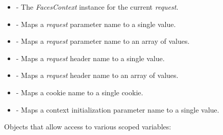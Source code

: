 \liststyleWWNumxi
\begin{itemize}
\item
{}\foreignlanguage{english}{
- The
}\foreignlanguage{english}{\textit{FacesContext}}\foreignlanguage{english}{
instance for the current
}\foreignlanguage{english}{\textit{request}}\foreignlanguage{english}{.
}
\item
{}\foreignlanguage{english}{
- Maps a
}\foreignlanguage{english}{\textit{request}}\foreignlanguage{english}{
parameter name to a single value. }
\item
{}\foreignlanguage{english}{
- Maps a
}\foreignlanguage{english}{\textit{request}}\foreignlanguage{english}{
parameter name to an array of values. }
\item
{}\foreignlanguage{english}{
- Maps a
}\foreignlanguage{english}{\textit{request}}\foreignlanguage{english}{
header name to a single value. }
\item
{}\foreignlanguage{english}{
- Maps a
}\foreignlanguage{english}{\textit{request}}\foreignlanguage{english}{
header name to an array of values. }
\item
{}\foreignlanguage{english}{
- Maps a cookie name to a single cookie. }
\item
{}\foreignlanguage{english}{
- Maps a context initialization parameter name to a single value.
\newline
}
\end{itemize}
\foreignlanguage{english}{Objects that allow access to various scoped
variables:}

